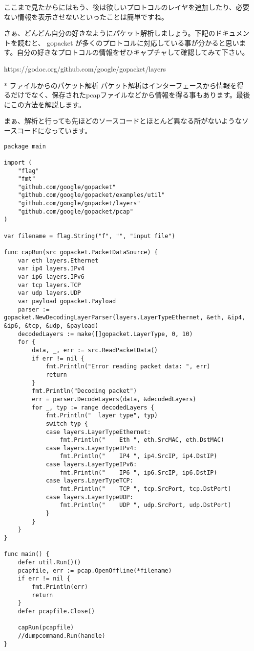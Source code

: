 ここまで見たからにはもう、後は欲しいプロトコルのレイヤを追加したり、必要ない情報を表示させないといったことは簡単ですね。

さぁ、どんどん自分の好きなようにパケット解析しましょう。下記のドキュメントを読むと、 gopacket が多くのプロトコルに対応している事が分かると思います。自分の好きなプロトコルの情報をぜひキャプチャして確認してみて下さい。

https://godoc.org/github.com/google/gopacket/layers

* ファイルからのパケット解析
パケット解析はインターフェースから情報を得るだけでなく、保存されたpcapファイルなどから情報を得る事もあります。最後にこの方法を解説します。

まぁ、解析と行っても先ほどのソースコードとほとんど異なる所がないようなソースコードになっています。

\begin{lstlisting}
package main

import (
	"flag"
	"fmt"
	"github.com/google/gopacket"
	"github.com/google/gopacket/examples/util"
	"github.com/google/gopacket/layers"
	"github.com/google/gopacket/pcap"
)

var filename = flag.String("f", "", "input file")

func capRun(src gopacket.PacketDataSource) {
	var eth layers.Ethernet
	var ip4 layers.IPv4
	var ip6 layers.IPv6
	var tcp layers.TCP
	var udp layers.UDP
	var payload gopacket.Payload
	parser := gopacket.NewDecodingLayerParser(layers.LayerTypeEthernet, &eth, &ip4, &ip6, &tcp, &udp, &payload)
	decodedLayers := make([]gopacket.LayerType, 0, 10)
	for {
		data, _, err := src.ReadPacketData()
		if err != nil {
			fmt.Println("Error reading packet data: ", err)
			return
		}
		fmt.Println("Decoding packet")
		err = parser.DecodeLayers(data, &decodedLayers)
		for _, typ := range decodedLayers {
			fmt.Println("  layer type", typ)
			switch typ {
			case layers.LayerTypeEthernet:
				fmt.Println("    Eth ", eth.SrcMAC, eth.DstMAC)
			case layers.LayerTypeIPv4:
				fmt.Println("    IP4 ", ip4.SrcIP, ip4.DstIP)
			case layers.LayerTypeIPv6:
				fmt.Println("    IP6 ", ip6.SrcIP, ip6.DstIP)
			case layers.LayerTypeTCP:
				fmt.Println("    TCP ", tcp.SrcPort, tcp.DstPort)
			case layers.LayerTypeUDP:
				fmt.Println("    UDP ", udp.SrcPort, udp.DstPort)
			}
		}
	}
}

func main() {
	defer util.Run()()
	pcapfile, err := pcap.OpenOffline(*filename)
	if err != nil {
		fmt.Println(err)
		return
	}
	defer pcapfile.Close()

	capRun(pcapfile)
	//dumpcommand.Run(handle)
}
\end{lstlisting}

